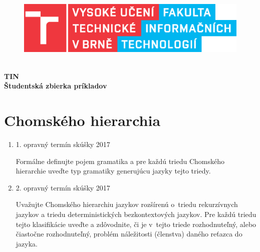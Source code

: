 \documentclass[11pt,a4paper]{article}
\begin{document}
	\begin{titlepage}
		\begin{center}
			\hfill\\[20em]
			\begin{figure}[H]
				\centering
				\includegraphics[scale=0.8]{logo.eps}
			\end{figure}
			\hfill\\[1em]
			\Huge{
				\textbf{
					TIN
				}
			}
			\hfill\\[1em]
			\huge{
				\textbf{
					Študentská zbierka príkladov
				}
			}
		\end{center}
	\end{titlepage}
	\newpage

	\tableofcontents
	\newpage

	\section{Chomského hierarchia}

	\begin{enumerate}
		\item 1. opravný termín skúšky 2017

		Formálne definujte pojem gramatika a pre každú triedu Chomského hierarchie uveďte typ gramatiky generujúcu jazyky tejto triedy.

		\item 2. opravný termín skúšky 2017

		Uvažujte Chomského hierarchiu jazykov rozšírenú o~triedu rekurzívnych jazykov a triedu deterministických bezkontextových jazykov. Pre každú triedu tejto klasifikácie uveďte a zdôvodnite, či je v~tejto triede rozhodnuteľný, alebo čiastočne rozhodnuteľný, problém náležitosti (členstva) daného reťazca do jazyka.
	\end{enumerate}
\end{document}
